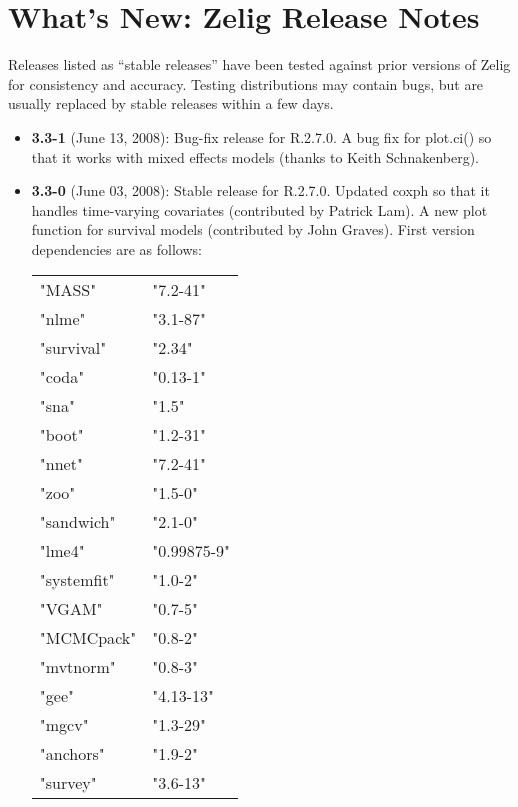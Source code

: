 
\section{What's New:  Zelig Release Notes}\label{release.notes}

Releases listed as ``stable releases'' have been tested against prior
versions of Zelig for consistency and accuracy.  Testing distributions
may contain bugs, but are usually replaced by stable releases within a
few days. 

\begin{itemize} 
  
\item {\bf 3.3-1} (June 13, 2008): Bug-fix release for R.2.7.0. A bug
  fix for {\rm plot.ci()} so that it works with mixed effects models
  (thanks to Keith Schnakenberg).
  
\item {\bf 3.3-0} (June 03, 2008): Stable release for R.2.7.0. Updated
  {\rm coxph} so that it handles time-varying covariates (contributed
  by Patrick Lam). A new plot function for survival models
  (contributed by John Graves). First version dependencies are as
  follows: \newline
\begin{tabular}{ll}\label{table.compact}
  "MASS"     & "7.2-41" \\
  "nlme"     & "3.1-87" \\
  "survival" & "2.34"    \\
  "coda"     & "0.13-1"  \\
  "sna"      & "1.5"     \\
  "boot"     & "1.2-31"  \\
  "nnet"     & "7.2-41"  \\
  "zoo"      & "1.5-0"   \\
  "sandwich" & "2.1-0"   \\
  "lme4"     & "0.99875-9" \\
  "systemfit" & "1.0-2" \\
  "VGAM"      & "0.7-5" \\
  "MCMCpack"  & "0.8-2" \\
  "mvtnorm"   & "0.8-3" \\
  "gee"       & "4.13-13" \\
  "mgcv"      & "1.3-29" \\
  "anchors"   & "1.9-2" \\
  "survey"    & "3.6-13" 
\end{tabular}
  

\end{itemize}
